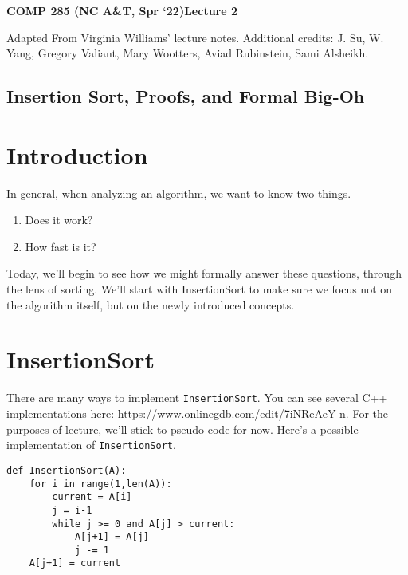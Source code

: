 \documentclass [12pt]{article}
\begin{document}
 

{\LARGE \textbf {COMP 285 (NC A\&T, Spr `22)}\hfill \textbf {Lecture 2} } 
\vspace {1em} 
\begin {Instruction} 

Adapted From Virginia Williams’ lecture notes. Additional credits: J. Su, W. Yang, Gregory Valiant, Mary Wootters, Aviad Rubinstein, Sami Alsheikh.
\end {Instruction} 

\begin{centering}
\section*{Insertion Sort, Proofs, and Formal Big-Oh}
\end{centering}


\section{Introduction}

In general, when analyzing an algorithm, we want to know two things.

\begin{enumerate}
    \item Does it work?
    \item How fast is it?
\end{enumerate}

Today, we’ll begin to see how we might formally answer these questions, through the lens
of sorting. We’ll start with InsertionSort to make sure we focus not on the algorithm itself, but on the newly introduced concepts.

\section{InsertionSort}

There are many ways to implement \texttt{InsertionSort}. You can see several C++ implementations here: \href{https://www.onlinegdb.com/edit/7iNReAeY-n}{https://www.onlinegdb.com/edit/7iNReAeY-n}. For the purposes of lecture, we'll stick to pseudo-code for now. Here's a possible implementation of \texttt{InsertionSort}.

\begin{verbatim}
def InsertionSort(A):
    for i in range(1,len(A)):
        current = A[i]
        j = i-1
        while j >= 0 and A[j] > current:
            A[j+1] = A[j]
            j -= 1
    A[j+1] = current
\end{verbatim}
\end{document}
